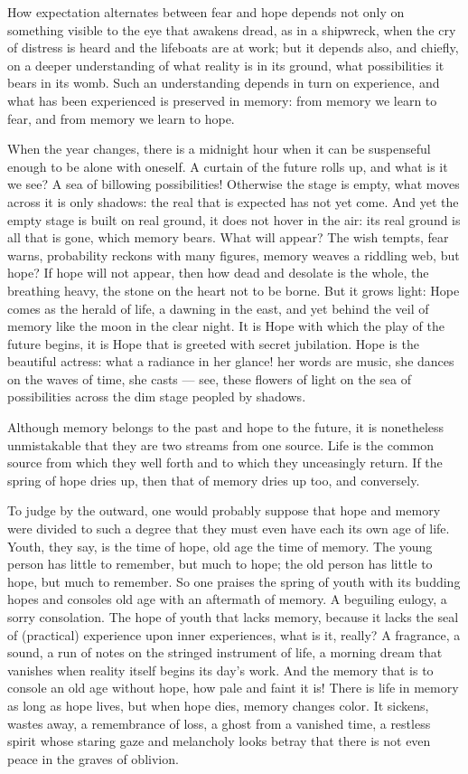 \documentclass[12pt,a4paper,openany]{book}
\newcommand{\opage}[1]{\marginnote{\footnotesize\textit{[#1]}}}
\begin{document}
How expectation alternates between fear and hope depends not only on something visible to the eye
that awakens dread, as in a shipwreck, when the cry of distress is heard and the lifeboats are at
work; but it depends also, and chiefly, on a deeper understanding of what reality is in its ground,
what possibilities it bears in its womb. Such an understanding depends in turn on experience, and
what has been experienced is preserved in memory: from memory we learn to fear, and from memory we
learn to hope.

When the year changes, there is a midnight hour when it can be suspenseful enough to be alone with
oneself. A curtain of the future rolls up, and what is it we see? A sea of billowing possibilities!
Otherwise the stage is empty, what moves across it is only shadows: the real that is expected has
not yet come. And yet the empty stage is built on real ground, it does not hover in the air: its
real ground is all that is gone, which memory bears. What will appear? The wish tempts, fear warns,
probability reckons with many figures, memory weaves a
\setcounter{footnote}{0}%
\opage{3}riddling web, but hope? If hope will not appear, then how dead and desolate is the whole,
the breathing heavy, the stone on the heart not to be borne. But it grows light: Hope comes as the
herald of life, a dawning in the east, and yet behind the veil of memory like the moon in the clear
night. It is Hope with which the play of the future begins, it is Hope that is greeted with secret
jubilation. Hope is the beautiful actress: what a radiance in her glance! her words are music, she
dances on the waves of time, she casts --- see, these flowers of light on the sea of possibilities
across the dim stage peopled by shadows.

Although memory belongs to the past and hope to the future, it is nonetheless unmistakable that they
are two streams from one source. Life is the common source from which they well forth and to which
they unceasingly return. If the spring of hope dries up, then that of memory dries up too, and
conversely.

To judge by the outward, one would probably suppose that hope and memory were divided to such a
degree that they must even have each its own age of life. Youth, they say, is the time of hope, old
age the time of memory. The young person has little to remember, but much to hope; the old person
has little to hope, but much to remember. So one praises the spring of youth with its budding hopes
and consoles old age with an aftermath of memory. A beguiling eulogy, a sorry consolation. The hope
of youth that lacks memory, because it lacks the seal of (practical) experience upon inner
experiences, what is it, really? A fragrance, a sound, a run of notes on the stringed instrument of
life, a morning dream that vanishes when reality itself begins its day's work. And the memory
\setcounter{footnote}{0}%
\opage{4}that is to console an old age without hope, how pale and faint it is! There is life in
memory as long as hope lives, but when hope dies, memory changes color. It sickens, wastes away, a
remembrance of loss, a ghost from a vanished time, a restless spirit whose staring gaze and
melancholy looks betray that there is not even peace in the graves of oblivion.
\end{document}
